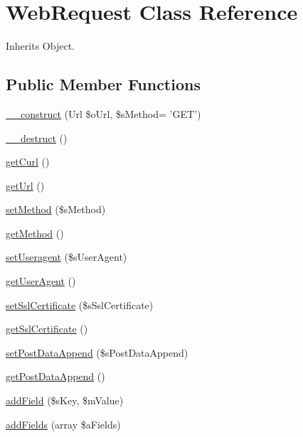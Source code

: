 \hypertarget{class_web_request}{\section{Web\-Request Class Reference}
\label{class_web_request}
}


Inherits Object.

\subsection*{Public Member Functions}
\begin{DoxyCompactItemize}
\item 
\hyperlink{class_web_request_af410e75d0eafdc425fe6696fc7b7f4a2}{\-\_\-\-\_\-construct} (Url \$o\-Url, \$s\-Method= 'G\-E\-T')
\item 
\hyperlink{class_web_request_ac56e1efa4d21c3cfd455aaee96f21078}{\-\_\-\-\_\-destruct} ()
\item 
\hyperlink{class_web_request_a2eb8132d4cee4f5a2857f85b5191d0cd}{get\-Curl} ()
\item 
\hyperlink{class_web_request_a8408cfa5a856061253d535776eb9b3d2}{get\-Url} ()
\item 
\hyperlink{class_web_request_ae9602e5fcf317610432d73b7643d19f7}{set\-Method} (\$s\-Method)
\item 
\hyperlink{class_web_request_a62d0b77ab586b36143f8f2af38b6e101}{get\-Method} ()
\item 
\hyperlink{class_web_request_a2bd29dc50643ea7c186e06f9cdd49bc7}{set\-Useragent} (\$s\-User\-Agent)
\item 
\hyperlink{class_web_request_a8c821a2cba2846a5a4280d2b7dcffdce}{get\-User\-Agent} ()
\item 
\hyperlink{class_web_request_aa22c1b13009bf613f4975bc126d3d730}{set\-Ssl\-Certificate} (\$s\-Ssl\-Certificate)
\item 
\hyperlink{class_web_request_afd9c2126ba8a100b62593aa2401b9398}{get\-Ssl\-Certificate} ()
\item 
\hyperlink{class_web_request_a00298e5aae2ab0f3c0bf751096a463fe}{set\-Post\-Data\-Append} (\$s\-Post\-Data\-Append)
\item 
\hyperlink{class_web_request_ae5c075355a705dcec44157cbbe0b6750}{get\-Post\-Data\-Append} ()
\item 
\hyperlink{class_web_request_a01d5e3e68b8b7ce654107bb1dabdcaa7}{add\-Field} (\$s\-Key, \$m\-Value)
\item 
\hyperlink{class_web_request_a44d394b7e9b9575759bb059cecc9e66c}{add\-Fields} (array \$a\-Fields)

\end{DoxyCompactItemize}
